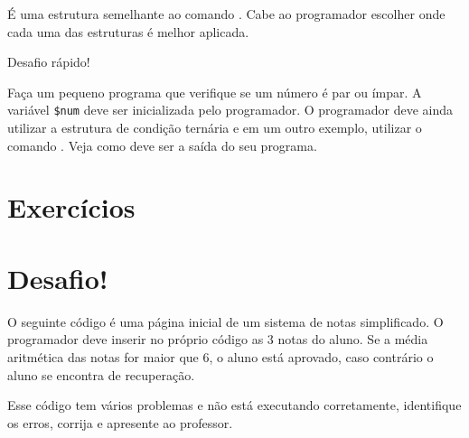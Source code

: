 É uma estrutura semelhante ao comando \comandoifelse. Cabe ao programador escolher onde
cada uma das estruturas é melhor aplicada.

{\Large Desafio rápido!}

Faça um pequeno programa que verifique se um número é par ou ímpar. A variável
\texttt{\$num} deve ser inicializada pelo programador. O programador deve ainda
utilizar a estrutura de condição ternária e em um outro exemplo, utilizar o comando
\comandoifelse. Veja como deve ser a saída do seu programa. 


\section{Exercícios}
\label{cap5-exercicios}

\section{Desafio!}
\label{cap5-desafio}
O seguinte código é uma página inicial de um sistema de notas simplificado.
O programador deve inserir no próprio código as 3 notas do aluno. Se a média aritmética 
das notas for maior que 6, o aluno está aprovado, caso contrário o aluno se encontra de 
recuperação.

Esse código tem vários problemas e não está executando corretamente, identifique os erros, 
corrija e apresente ao professor.

